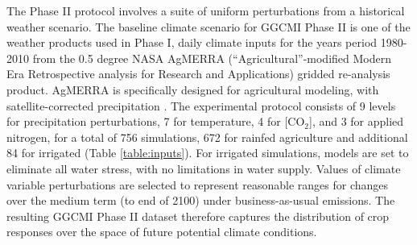 \documentclass[gmd, manuscript]{copernicus} %
\begin{document}
The Phase II protocol involves a suite of uniform perturbations from a historical weather scenario. 
The baseline climate scenario for GGCMI Phase II is one of the weather products used in Phase I, daily climate inputs for the years period 1980-2010 from the 0.5 degree NASA AgMERRA (``Agricultural''-modified Modern Era Retrospective analysis for Research and Applications) gridded re-analysis product. AgMERRA is specifically designed for agricultural modeling, with satellite-corrected precipitation \citep{Ruane2015}. 
The experimental protocol consists of 9 levels for precipitation perturbations, 7 for temperature, 4 for [CO$_2$], and 3 for applied nitrogen, for a total of 756 simulations, 672 for rainfed agriculture and additional 84 for irrigated (Table \ref{table:inputs}).  For irrigated simulations, models are set to eliminate all water stress, with no limitations in water supply. 
Values of climate variable perturbations are selected to represent reasonable ranges for changes over the medium term (to end of 2100) under business-as-usual emissions. 
The resulting GGCMI Phase II dataset therefore captures the distribution of crop responses over the space of future potential climate conditions.
\end{document}
